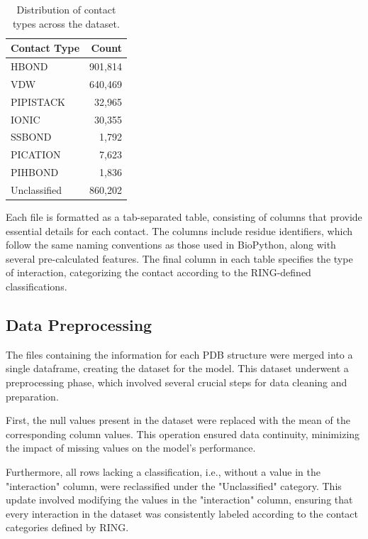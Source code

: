 \documentclass[10pt,twocolumn,letterpaper]{article}
\begin{document}
\begin{table}[h!]
\centering
\begin{tabular}{|l|r|}
\hline
\textbf{Contact Type} & \textbf{Count} \\
\hline
HBOND & 901,814 \\
VDW & 640,469 \\
PIPISTACK & 32,965 \\
IONIC & 30,355 \\
SSBOND & 1,792 \\
PICATION & 7,623 \\
PIHBOND & 1,836 \\
Unclassified & 860,202 \\
\hline
\end{tabular}
\caption{Distribution of contact types across the dataset.}
\end{table}

Each file is formatted as a tab-separated table, consisting of columns that provide essential details for each contact. The columns include residue identifiers, which follow the same naming conventions as those used in BioPython, along with several pre-calculated features. The final column in each table specifies the type of interaction, categorizing the contact according to the RING-defined classifications.

\subsection{Data Preprocessing}

The files containing the information for each PDB structure were merged into a single dataframe, creating the dataset for the model. This dataset underwent a preprocessing phase, which involved several crucial steps for data cleaning and preparation.

First, the null values present in the dataset were replaced with the mean of the corresponding column values. This operation ensured data continuity, minimizing the impact of missing values on the model's performance.

Furthermore, all rows lacking a classification, i.e., without a value in the "interaction" column, were reclassified under the "Unclassified" category. This update involved modifying the values in the "interaction" column, ensuring that every interaction in the dataset was consistently labeled according to the contact categories defined by RING.

\end{document}
